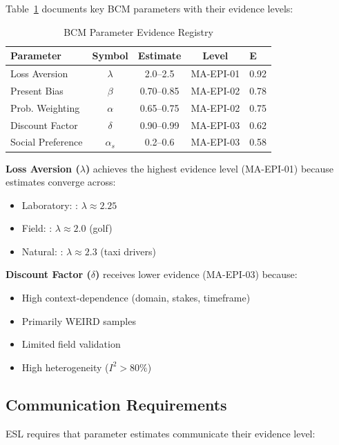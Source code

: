 \documentclass[11pt,a4paper]{article}
\begin{document}
Table~\ref{tab:BCM-params} documents key BCM parameters with their
evidence levels:

\begin{table}[h]
\centering
\caption{BCM Parameter Evidence Registry}
\label{tab:BCM-params}
\begin{tabular}{lcccl}
\toprule
\textbf{Parameter} & \textbf{Symbol} & \textbf{Estimate} & \textbf{Level} & \textbf{E} \\
\midrule
Loss Aversion & $\lambda$ & 2.0--2.5 & MA-EPI-01 & 0.92 \\
Present Bias & $\beta$ & 0.70--0.85 & MA-EPI-02 & 0.78 \\
Prob. Weighting & $\alpha$ & 0.65--0.75 & MA-EPI-02 & 0.75 \\
Discount Factor & $\delta$ & 0.90--0.99 & MA-EPI-03 & 0.62 \\
Social Preference & $\alpha_s$ & 0.2--0.6 & MA-EPI-03 & 0.58 \\
\bottomrule
\end{tabular}
\end{table}

\textbf{Loss Aversion ($\lambda$)} achieves the highest evidence level
(MA-EPI-01) because estimates converge across:
\begin{itemize}
    \item Laboratory: \citet{KahnemanTversky1992}: $\lambda \approx 2.25$
    \item Field: \citet{PopeSchweitzer2011}: $\lambda \approx 2.0$ (golf)
    \item Natural: \citet{Camerer1997}: $\lambda \approx 2.3$ (taxi drivers)
\end{itemize}

\textbf{Discount Factor ($\delta$)} receives lower evidence (MA-EPI-03)
because:
\begin{itemize}
    \item High context-dependence (domain, stakes, timeframe)
    \item Primarily WEIRD samples
    \item Limited field validation
    \item High heterogeneity ($I^2 > 80\%$)
\end{itemize}

\subsection{Communication Requirements}

ESL requires that parameter estimates communicate their evidence level:
\end{document}
